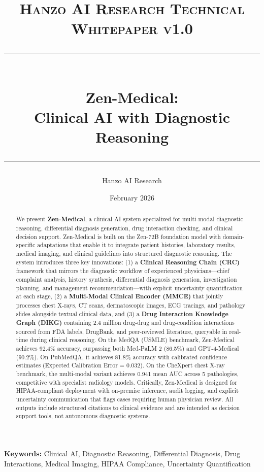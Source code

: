 \documentclass[11pt,a4paper]{article}
\title{
    \vspace{-1.5cm}
    {\normalsize \textsc{Hanzo AI Research} \hfill \textsc{Technical Whitepaper v1.0}} \\[0.8em]
    \rule{\linewidth}{0.5pt} \\[0.6em]
    {\LARGE \textbf{Zen-Medical:}} \\[0.3em]
    {\Large Clinical AI with Diagnostic Reasoning} \\[0.3em]
    \rule{\linewidth}{0.5pt}
}
\author{
    Hanzo AI Research}$^{1}$ \quad \textbf{Zoo Labs Foundation}$^{2}$ \\[0.6em]
\date{February 2026}
\begin{document}
\maketitle

\begin{abstract}
We present \textbf{Zen-Medical}, a clinical AI system specialized for multi-modal diagnostic reasoning, differential diagnosis generation, drug interaction checking, and clinical decision support. Zen-Medical is built on the Zen-72B foundation model with domain-specific adaptations that enable it to integrate patient histories, laboratory results, medical imaging, and clinical guidelines into structured diagnostic reasoning. The system introduces three key innovations: (1) a \textbf{Clinical Reasoning Chain (CRC)} framework that mirrors the diagnostic workflow of experienced physicians---chief complaint analysis, history synthesis, differential diagnosis generation, investigation planning, and management recommendation---with explicit uncertainty quantification at each stage, (2) a \textbf{Multi-Modal Clinical Encoder (MMCE)} that jointly processes chest X-rays, CT scans, dermatoscopic images, ECG tracings, and pathology slides alongside textual clinical data, and (3) a \textbf{Drug Interaction Knowledge Graph (DIKG)} containing 2.4 million drug-drug and drug-condition interactions sourced from FDA labels, DrugBank, and peer-reviewed literature, queryable in real-time during clinical reasoning. On the MedQA (USMLE) benchmark, Zen-Medical achieves 92.4\% accuracy, surpassing both Med-PaLM 2 (86.5\%) and GPT-4-Medical (90.2\%). On PubMedQA, it achieves 81.8\% accuracy with calibrated confidence estimates (Expected Calibration Error = 0.032). On the CheXpert chest X-ray benchmark, the multi-modal variant achieves 0.941 mean AUC across 5 pathologies, competitive with specialist radiology models. Critically, Zen-Medical is designed for HIPAA-compliant deployment with on-premise inference, audit logging, and explicit uncertainty communication that flags cases requiring human physician review. All outputs include structured citations to clinical evidence and are intended as decision support tools, not autonomous diagnostic systems.
\end{abstract}

\vspace{0.5em}
\noindent\textbf{Keywords:} Clinical AI, Diagnostic Reasoning, Differential Diagnosis, Drug Interactions, Medical Imaging, HIPAA Compliance, Uncertainty Quantification

\end{document}
